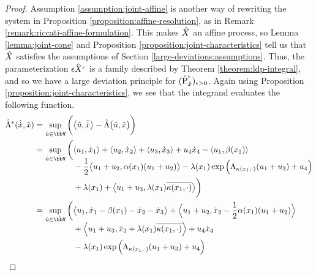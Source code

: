 \begin{proof}
  \label{proof:theorem:ldp-closed-form}
  Assumption \ref{assumption:joint-affine} is another way of rewriting the system in Proposition \ref{proposition:affine-resolution}, as in Remark \ref{remark:riccati-affine-formulation}.
  This makes $\hat{X}$ an affine process, so Lemma \ref{lemma:joint-cone} and Proposition \ref{proposition:joint-characteristics} tell us that $\hat{X}$ satisfies the assumptions of Section \ref{large-deviations:assumptions}.
  Thus, the parameterization $\hat{\epsilon X^\epsilon}$ is a family described by Theorem \ref{theorem:ldp-integral}, and so we have a large deviation principle for $(\hat{{\operatorname{P}}}^\epsilon_{\hat{x}})_{\epsilon>0}$.
  Again using Proposition \ref{proposition:joint-characteristics}, we see that the integrand evaluates the following function.
  \begin{align}
    \notag
    \hat\ode^*(\hat{\diffVar}, \hat\stateVar) 
    &= \sup_{\hat\momentVar \in \hat\vecSpace} \bigg( \bprj{\hat\momentVar}{\hat\diffVar} - \hat\ode\big(\hat\momentVar, \hat\stateVar\big) \bigg) \\
    \notag
    &= \sup_{\hat\momentVar \in \hat\vecSpace} \bigg(\begin{aligned}[t]
      &\prj{\momentVar_1}{\diffVar_1} 
      + \prj{\momentVar_2}{\diffVar_2} 
      + \prj{\momentVar_3}{\diffVar_3} 
      + \momentVar_4\diffVar_4
      - \prj{\momentVar_1}{\affDrift(\stateVar_1)}  \\
      &- \frac12\bprj{\momentVar_1+\momentVar_2}{\affDiff(\stateVar_1)(\momentVar_1+\momentVar_2)} 
      - \affInt(\stateVar_1)\exp\Big(\ode_{\affDist(\stateVar_1,\cdot)}(\momentVar_1+\momentVar_3) + \momentVar_4\Big) \\
      &+ \affInt(\stateVar_1) 
      + \bprj{\momentVar_1+\momentVar_3}{\affInt(\stateVar_1)\overline{\affDist(\stateVar_1,\cdot)}}  \bigg) 
    \end{aligned} \\
    \label{eq:optimizing-integrand}
    &= \sup_{\hat\momentVar\in\hat\vecSpace} \bigg(\begin{aligned}[t]
      & \bprj{\momentVar_1}{\diffVar_1 - \affDrift(\stateVar_1) - \diffVar_2 - \diffVar_3} 
      + \Bprj{\momentVar_1+\momentVar_2}{\diffVar_2 
      - \frac12\affDiff(\stateVar_1)(\momentVar_1+\momentVar_2)} \\
      &+ \Bprj{\momentVar_1+\momentVar_3}{\diffVar_3 + \affInt(\stateVar_1)\overline{\affDist(\stateVar_1,\cdot)}} 
      + \momentVar_4\diffVar_4 \\
      &- \affInt(\stateVar_1) \exp\Big(\ode_{\affDist(\stateVar_1,\cdot)}(\momentVar_1+\momentVar_3) + \momentVar_4\Big)

\end{aligned}
\end{align}
\end{proof}
